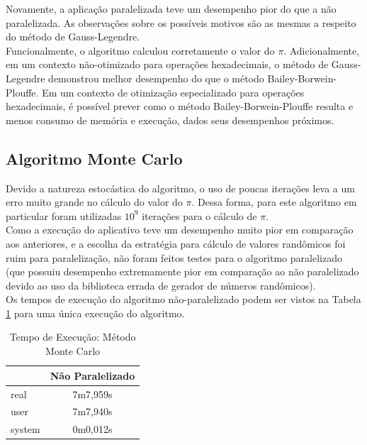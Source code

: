 \documentclass[12pt]{article}
\begin{document}
Novamente, a aplicação paralelizada teve um desempenho pior do que a não paralelizada. 
As observações sobre os possíveis motivos são as mesmas a respeito do método de Gauss-Legendre.\\

Funcionalmente, o algoritmo calculou corretamente o valor do $\pi$. Adicionalmente,
em um contexto não-otimizado para operações hexadecimais, o método de Gauss-Legendre demonstrou
melhor desempenho do que o método Bailey-Borwein-Plouffe. Em um contexto de otimização
especializado para operações hexadecimais, é possível prever como o método
Bailey-Borwein-Plouffe resulta e menos consumo de memória e execução, dados seus desempenhos
próximos.\\

\subsection{Algoritmo Monte Carlo}

Devido a natureza estocástica do algoritmo, o uso de poucas iterações leva a um erro muito
grande no cálculo do valor do $\pi$. Dessa forma, para este algoritmo em particular foram
utilizadas $10^9$ iterações para o cálculo de $\pi$.\\

Como a execução do aplicativo teve um desempenho muito pior em comparação aos anteriores,
e a escolha da estratégia para cálculo de valores randômicos foi ruim para paralelização,
não foram feitos testes para o algoritmo paralelizado (que possuiu desempenho extremamente
pior em comparação ao não paralelizado devido ao uso da biblioteca errada de gerador de 
números randômicos).\\

Os tempos de execução do algoritmo não-paralelizado podem ser vistos na Tabela \ref{tab:table04}
para uma única execução do algoritmo.\\

\begin{table}[h]
	\centering
	\caption{Tempo de Execução: Método Monte Carlo}
	\begin{tabular}{|l|c|}
		\hline
		{}		& Não Paralelizado \\
		\hline
		real 	& 7m7,959s\\
		user 	& 7m7,940s\\
		system 	& 0m0,012s\\
		\hline
	\end{tabular}
	\label{tab:table04}
\end{table}
\end{document}
